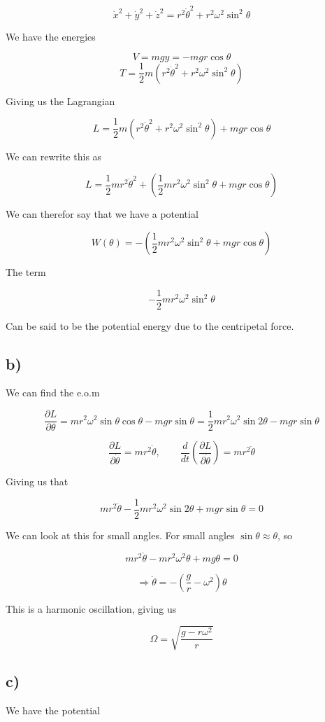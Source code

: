 \documentclass[a4paper,norsk, 10pt]{article}
\begin{document}
$$
\dot{x}^2 + \dot{y}^2 + \dot{z}^2 = r^2\dot{\theta}^2 + r^2\omega^2\sin^2 \theta
$$

We have the energies 

$$
V = mgy = -mgr\cos\theta
$$
$$
T = \frac{1}{2}m(r^2\dot{\theta}^2 +r^2\omega^2\sin^2\theta)
$$

Giving us the Lagrangian

$$
L = \frac{1}{2}m(r^2\dot{\theta}^2 +r^2\omega^2\sin^2\theta) + mgr\cos\theta
$$

We can rewrite this as

$$
L = \frac{1}{2}mr^2\dot{\theta}^2+ (\frac{1}{2}mr^2\omega^2\sin^2\theta + mgr\cos\theta)
$$

We can therefor say that we have a potential

$$
W(\theta) = -(\frac{1}{2}mr^2\omega^2\sin^2\theta + mgr\cos\theta)
$$

The term 

$$
-\frac{1}{2}mr^2\omega^2\sin^2\theta
$$

Can be said to be the potential energy due to the centripetal force.

\subsection*{b)}

We can find the e.o.m

$$
\frac{\partial L}{\partial \theta} = mr^2\omega^2\sin\theta\cos\theta - mgr\sin\theta =  \frac{1}{2}mr^2\omega^2\sin 2\theta - mgr\sin\theta
$$

$$
\frac{\partial L}{\partial \dot{\theta}} = mr^2\dot{\theta}, \qquad \frac{d}{dt}\left(\frac{\partial L}{\partial \dot{\theta}}\right) = mr^2\ddot{\theta}
$$

Giving us that

$$
mr^2\ddot{\theta} - \frac{1}{2}mr^2\omega^2\sin 2\theta + mgr\sin\theta = 0
$$

We can look at this for small angles. For small angles $\sin \theta \approx \theta$, so

$$
mr^2\ddot{\theta} - mr^2\omega^2\theta +mg\theta = 0
$$

$$
\Rightarrow \ddot{\theta} = -\left(\frac{g}{r} - \omega^2\right)\theta
$$

This is a harmonic oscillation, giving us

$$
\Omega = \sqrt{\frac{g-r\omega^2}{r}}
$$

\subsection*{c)}
We have the potential
\end{document}
